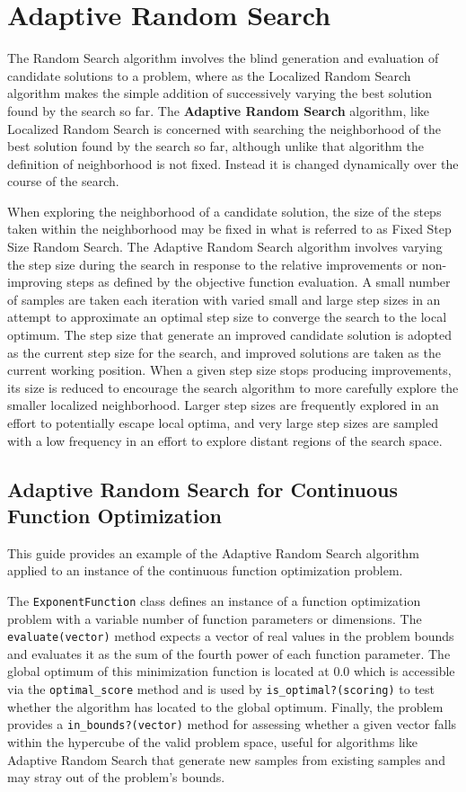 \section{Adaptive Random Search}
The Random Search algorithm involves the blind generation and evaluation of candidate solutions to a problem, where as the Localized Random Search algorithm makes the simple addition of successively varying the best solution found by the search so far. The \textbf{Adaptive Random Search} algorithm, like Localized Random Search is concerned with searching the neighborhood of the best solution found by the search so far, although unlike that algorithm the definition of neighborhood is not fixed. Instead it is changed dynamically over the course of the search.

When exploring the neighborhood of a candidate solution, the size of the steps taken within the neighborhood may be fixed in what is referred to as Fixed Step Size Random Search. The Adaptive Random Search algorithm involves varying the step size during the search in response to the relative improvements or non-improving steps as defined by the objective function evaluation. A small number of samples are taken each iteration with varied small and large step sizes in an attempt to approximate an optimal step size to converge the search to the local optimum. The step size that generate an improved candidate solution is adopted as the current step size for the search, and improved solutions are taken as the current working position. When a given step size stops producing improvements, its size is reduced to encourage the search algorithm to more carefully explore the smaller localized neighborhood. Larger step sizes are frequently explored in an effort to potentially escape local optima, and very large step sizes are sampled with a low frequency in an effort to explore distant regions of the search space.

\subsection{Adaptive Random Search for Continuous Function Optimization}
This guide provides an example of the Adaptive Random Search algorithm applied to an instance of the continuous function optimization problem.

The \texttt{ExponentFunction} class defines an instance of a function optimization problem with a variable number of function parameters or dimensions. The \texttt{evaluate(vector)} method expects a vector of real values in the problem bounds and evaluates it as the sum of the fourth power of each function parameter. The global optimum of this minimization function is located at 0.0 which is accessible via the \texttt{optimal\_score} method and is used by \texttt{is\_optimal?(scoring)} to test whether the algorithm has located to the global optimum. Finally, the problem provides a \texttt{in\_bounds?(vector)} method for assessing whether a given vector falls within the hypercube of the valid problem space, useful for algorithms like Adaptive Random Search that generate new samples from existing samples and may stray out of the problem's bounds.

